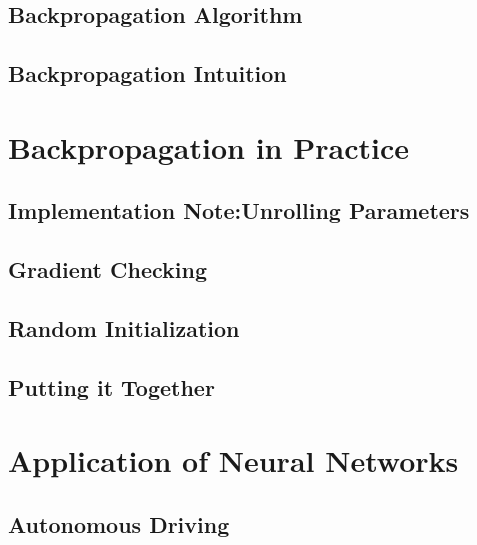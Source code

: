 \documentclass{article}
\begin{document}
\begin{CJK}{UTF8}{gbsn}
\subsection{Backpropagation Algorithm}
\subsection{Backpropagation Intuition}
\subparagraph{}
\section{Backpropagation in Practice}
\subsection{Implementation Note:Unrolling Parameters}
\subsection{Gradient Checking}
\subsection{Random Initialization}
\subsection{Putting it Together}
\section{Application of Neural Networks}
\subsection{Autonomous Driving}
\end{CJK}
\end{document}

